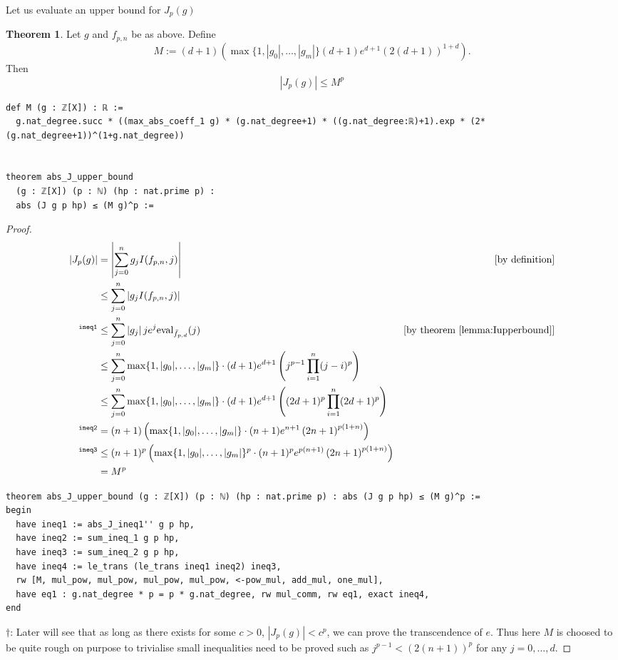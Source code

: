 \documentclass{report}
\theoremstyle{definition}
\newtheorem{theorem}{Theorem}[section]
\begin{document}
Let us evaluate an upper bound for $J_p(g)$
\begin{theorem}\label{thm:upperbound}
Let $g$ and $f_{p,n}$ be as above. Define
$$M:=(d+1)\left(\max\{1,|g_0|,\dots,|g_m|\}(d+1)e^{d+1}\left(2(d+1)\right)^{1+d}\right).$$
Then
$$
\left|J_p(g)\right|\le M^p
$$

\begin{verbatim}
def M (g : ℤ[X]) : ℝ :=
  g.nat_degree.succ * ((max_abs_coeff_1 g) * (g.nat_degree+1) * ((g.nat_degree:ℝ)+1).exp * (2*(g.nat_degree+1))^(1+g.nat_degree))


theorem abs_J_upper_bound 
  (g : ℤ[X]) (p : ℕ) (hp : nat.prime p) :
  abs (J g p hp) ≤ (M g)^p :=
\end{verbatim}
\end{theorem}

\begin{proof}
\begin{equation*}
\begin{aligned}
\left|J_p(g)\right|&=\left|\sum_{j=0}^ng_j I(f_{p,n}, j)\right| &[\text{by definition}]\\
&\le\sum_{j=0}^n\left|g_jI(f_{p,n}, j)\right|\\
{}^{\tt ineq1}&\le\sum_{j=0}^n\left|g_j\right|je^j\mathrm{eval}_{\bar{f}_{p,d}}(j)&[\text{by theorem \ref{lemma:Iupperbound}}]\\
&\le\sum_{j=0}^n\max\{1,|g_0|,\dots,|g_m|\}\cdot(d+1)e^{d+1}\left(j^{p-1}\prod_{i=1}^n(j-i)^p\right)\\
&\le\sum_{j=0}^n\max\{1,|g_0|,\dots,|g_m|\}\cdot(d+1)e^{d+1}\left((2d+1)^{p}\prod_{i=1}^n(2d+1)^p\right)\\
{}^{\tt ineq2}&=(n+1)\left(\max\{1,|g_0|,\dots,|g_m|\}\cdot(n+1)e^{n+1}\left(2n+1\right)^{p(1+n)}\right)\\
{}^{\tt ineq3}&\le(n+1)^p\left(\max\{1,|g_0|,\dots,|g_m|\}^p\cdot(n+1)^pe^{p(n+1)}\left(2n+1\right)^{p(1+n)}\right)\\
&= M^p
\end{aligned}
\end{equation*}

\begin{verbatim}
theorem abs_J_upper_bound (g : ℤ[X]) (p : ℕ) (hp : nat.prime p) : abs (J g p hp) ≤ (M g)^p :=
begin
  have ineq1 := abs_J_ineq1'' g p hp,
  have ineq2 := sum_ineq_1 g p hp,
  have ineq3 := sum_ineq_2 g p hp,
  have ineq4 := le_trans (le_trans ineq1 ineq2) ineq3,
  rw [M, mul_pow, mul_pow, mul_pow, mul_pow, <-pow_mul, add_mul, one_mul],
  have eq1 : g.nat_degree * p = p * g.nat_degree, rw mul_comm, rw eq1, exact ineq4,
end
\end{verbatim}
$\dagger$: Later will see that as long as there exists for some $c>0$, $|J_p(g)|<c^p$, we can prove the transcendence of $e$. Thus here $M$ is choosed to be quite rough on purpose to trivialise small inequalities need to be proved such as $j^{p-1}<(2(n+1))^p$ for any $j=0,\dots,d$.
\end{proof}
\end{document}
